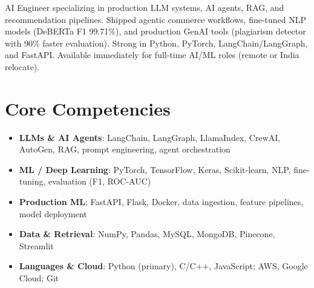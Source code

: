 \documentclass[11pt,a4paper,sans]{moderncv}
\begin{document}
\makecvtitle

\vspace{6pt}
\small{AI Engineer specializing in production LLM systems, AI agents, RAG, and recommendation pipelines. Shipped agentic commerce workflows, fine-tuned NLP models (DeBERTa F1 99.71\%), and production GenAI tools (plagiarism detector with 90\% faster evaluation). Strong in Python, PyTorch, LangChain/LangGraph, and FastAPI. Available immediately for full-time AI/ML roles (remote or India relocate).}

\section{Core Competencies}
\vspace{1pt}
\begin{itemize}
\item \textbf{LLMs \& AI Agents}: LangChain, LangGraph, LlamaIndex, CrewAI, AutoGen, RAG, prompt engineering, agent orchestration
\item \textbf{ML / Deep Learning}: PyTorch, TensorFlow, Keras, Scikit-learn, NLP, fine-tuning, evaluation (F1, ROC-AUC)
\item \textbf{Production ML}: FastAPI, Flask, Docker, data ingestion, feature pipelines, model deployment
\item \textbf{Data \& Retrieval}: NumPy, Pandas, MySQL, MongoDB, Pinecone, Streamlit
\item \textbf{Languages \& Cloud}: Python (primary), C/C++, JavaScript; AWS, Google Cloud; Git
\end{itemize}
\end{document}
